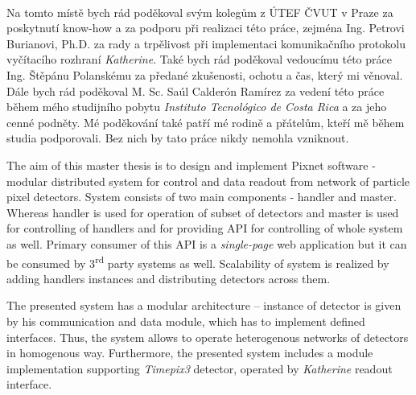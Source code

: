 \documentclass[11pt,twoside,a4paper]{book}
\begin{document}
	\translate				%


	\coverpagestarts

	\newpage~
	
	
	\newpage

	\acknowledgements
	\noindent
	Na tomto místě bych rád poděkoval svým kolegům z ÚTEF ČVUT v Praze za poskytnutí know-how a za podporu při realizaci této práce, zejména Ing. Petrovi Burianovi, Ph.D. za rady a trpělivost při implementaci komunikačního protokolu vyčítacího rozhraní \textit{Katherine}. Také bych rád poděkoval vedoucímu této práce Ing. Štěpánu Polanskému za předané zkušenosti, ochotu a čas, který mi věnoval. Dále bych rád poděkoval M. Sc. Saúl Calderón Ramírez za vedení této práce během mého studijního pobytu \textit{Instituto Tecnológico de Costa Rica} a za jeho cenné podněty. Mé poděkování také patří mé rodině a přátelům, kteří mě během studia podporovali. Bez nich by tato práce nikdy nemohla vzniknout.





 
	\abstractpage
	The aim of this master thesis is to design and implement Pixnet software - modular distributed system for control and data readout from network of particle pixel detectors. System consists of two main components - handler and master. Whereas handler is used for operation of subset of detectors and master is used for controlling of handlers and for providing API for controlling of whole system as well. Primary consumer of this API is a \textit{single-page} web application but it can be consumed by 3\textsuperscript{rd} party systems as well. Scalability of system is realized by adding handlers instances and distributing detectors across them.

	The presented system has a modular architecture -- instance of detector is given by his communication and data module, which has to implement defined interfaces. Thus, the system allows to operate heterogenous networks of detectors in homogenous way. 
	Furthermore, the presented system includes a module implementation supporting \textit{Timepix3} detector, operated by \textit{Katherine} readout interface.
\end{document}
